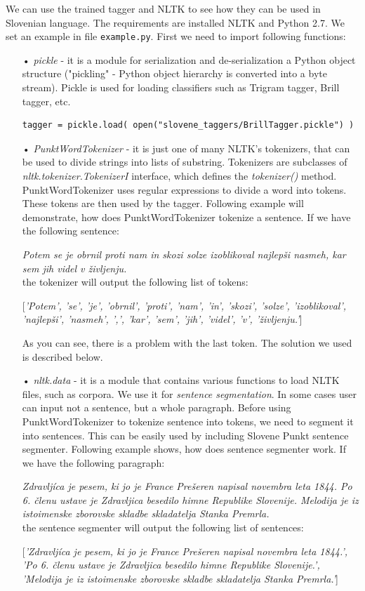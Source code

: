\documentclass[10pt, conference, compsocconf]{IEEEtran}
\begin{document}
We can use the trained tagger and NLTK to see how they can be used in Slovenian language. The requirements are installed NLTK and Python 2.7. We set an example in file \texttt{example.py}.
First we need to import following functions:
\begin{itemize}
\item[•] \textit{pickle} - it is a module for serialization and de-serialization a Python object structure ("pickling" - Python object hierarchy is converted into a byte stream). Pickle is used for loading classifiers such as Trigram tagger, Brill tagger, etc.
\begin{lstlisting}
tagger = pickle.load( open("slovene_taggers/BrillTagger.pickle") )
\end{lstlisting}

\item[•] \textit{PunktWordTokenizer} \cite{tokenizer} - it is just one of many NLTK's tokenizers, that can be used to divide strings into lists of substring. Tokenizers are subclasses of \textit{nltk.tokenizer.TokenizerI} interface, which defines the \textit{tokenizer()} method. PunktWordTokenizer uses regular expressions to divide a word into tokens. These tokens are then used by the tagger. Following example will demonstrate, how does PunktWordTokenizer tokenize a sentence. If we have the following sentence:

\textit{Potem se je obrnil proti nam in skozi solze izoblikoval najlepši nasmeh, kar sem jih videl v življenju.}\\
the tokenizer will output the following list of tokens:

[\textit{'Potem', 'se', 'je', 'obrnil', 'proti', 'nam', 'in', 'skozi', 'solze', 'izoblikoval', 'najlepši', 'nasmeh', ',', 'kar', 'sem', 'jih', 'videl', 'v', 'življenju.'}]

As you can see, there is a problem with the last token. The solution we used is described below.

\item[•] \textit{nltk.data} - it is a module that contains various functions to load NLTK files, such as corpora. We use it for \textit{sentence segmentation}. In some cases user can input not a sentence, but a whole paragraph. Before using PunktWordTokenizer to tokenize sentence into tokens, we need to segment it into sentences. This can be easily used by including Slovene Punkt sentence segmenter. Following example shows, how does sentence segmenter work. If we have the following paragraph:

\textit{Zdravljíca je pesem, ki jo je France Prešeren napisal novembra leta 1844. Po 6. členu ustave je Zdravljica besedilo himne Republike Slovenije. Melodija je iz istoimenske zborovske skladbe skladatelja Stanka Premrla.}\\

the sentence segmenter will output the following list of sentences:

[\textit{'Zdravljíca je pesem, ki jo je France Prešeren napisal novembra leta 1844.', 'Po 6. členu ustave je Zdravljica besedilo himne Republike Slovenije.', 'Melodija je iz istoimenske zborovske skladbe skladatelja Stanka Premrla.'}]
\end{itemize} 
\end{document}
